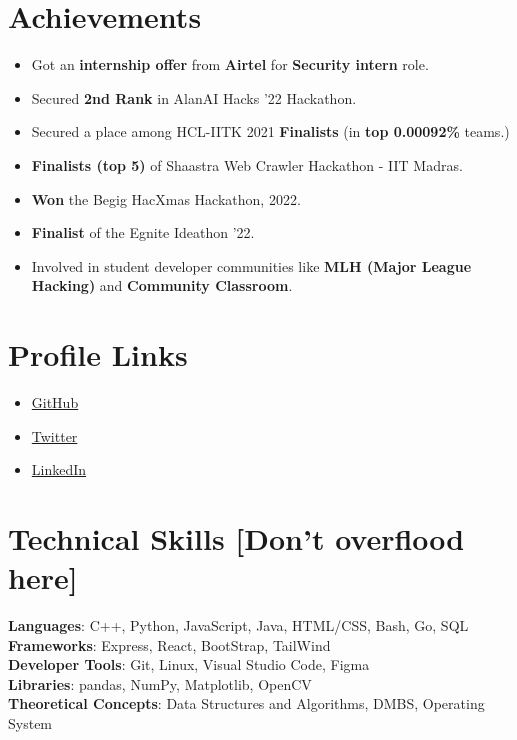 \documentclass[letterpaper,11pt]{article}
\newcommand{\resumeItem}[1]{
  \item\small{
    {#1 \vspace{-2pt}}
  }
}
\newcommand{\resumeItemListStart}{\begin{itemize}}
\newcommand{\resumeItemListEnd}{\end{itemize}\vspace{-5pt}}
\begin{document}
\section{Achievements}
 \begin{itemize}[leftmargin=0.15in, label={}]
    \resumeItemListStart
        \resumeItem{Got an \textbf{internship offer} from \textbf{Airtel} for \textbf{Security intern} role.}
        \resumeItem{Secured \textbf{2nd Rank} in AlanAI Hacks '22 Hackathon.}
        \resumeItem{Secured a place among HCL-IITK 2021 \textbf{Finalists} (in \textbf{top 0.00092\%} teams.)}
        \resumeItem{\textbf{Finalists (top 5)} of Shaastra Web Crawler Hackathon - IIT Madras.}
        \resumeItem{\textbf{Won} the Begig HacXmas Hackathon, 2022.}
        \resumeItem{\textbf{Finalist} of the Egnite Ideathon '22.}
        \resumeItem{Involved in student developer communities like \textbf{MLH (Major League Hacking)} and \textbf{Community Classroom}.}
      \resumeItemListEnd
 \end{itemize}
 \vspace{-16pt}
 
\section{Profile Links}
 \begin{itemize}[leftmargin=0.15in, label={}]
    \resumeItemListStart
        \resumeItem {\href{https://github.com/godofgeeks23}{GitHub}}
        \resumeItem {\href{https://twitter.com/godofgeeks_}{Twitter}}
        \resumeItem {\href{https://www.linkedin.com/in/aviral-srivastava-07b1a4202/}{LinkedIn}}
      \resumeItemListEnd
 \end{itemize}
 \vspace{-16pt}

%
\section{Technical Skills [Don't overflood here]}
 \begin{itemize}[leftmargin=0.15in, label={}]
    \small{\item{
     \textbf{Languages}{: C++, Python, JavaScript, Java, HTML/CSS, Bash, Go, SQL} \\
     \textbf{Frameworks}{: Express, React, BootStrap, TailWind} \\
     \textbf{Developer Tools}{: Git, Linux, Visual Studio Code, Figma} \\
     \textbf{Libraries}{: pandas, NumPy, Matplotlib, OpenCV} \\
     \textbf{Theoretical Concepts}{: Data Structures and Algorithms, DMBS, Operating System} \\
    }}
 \end{itemize}
 \vspace{-16pt}
\end{document}
